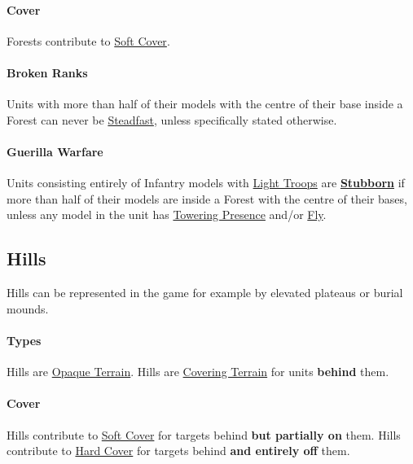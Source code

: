 \paragraph{Cover}

Forests contribute to \hyperref[covering_terrain]{Soft Cover}.

\paragraph{Broken Ranks}

Units with more than half of their models with the centre of their base inside a Forest can never be \hyperref[steadfast]{Steadfast}, unless specifically stated otherwise.

\paragraph{Guerilla Warfare}

Units consisting entirely of Infantry models with \hyperref[light_troops]{Light Troops} are \hyperref[stubborn]{\textbf{Stubborn}} if more than half of their models are inside a Forest with the centre of their bases, unless any model in the unit has \hyperref[towering_presence]{Towering Presence} and/or \hyperref[fly]{Fly}.

\columnbreak

\subsection{Hills}
\label{hills}

Hills can be represented in the game for example by elevated plateaus or burial mounds.

\paragraph{Types}

Hills are \hyperref[opaque_terrain]{Opaque Terrain}.\newline
Hills are \hyperref[covering_terrain]{Covering Terrain} for units \textbf{behind} them.

\paragraph{Cover}

Hills contribute to \hyperref[covering_terrain]{Soft Cover} for targets behind \textbf{but partially on} them.\newline
Hills contribute to \hyperref[covering_terrain]{Hard Cover} for targets behind \textbf{and entirely off} them.


